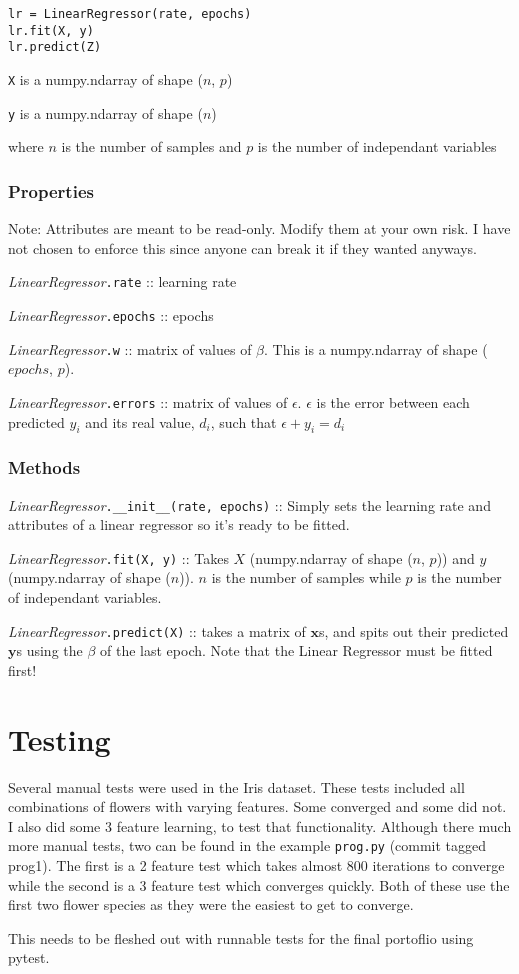 \documentclass{article}
\begin{document}
\begin{verbatim}
lr = LinearRegressor(rate, epochs)
lr.fit(X, y)
lr.predict(Z)
\end{verbatim}

\texttt{X} is a numpy.ndarray of shape ($n$, $p$)

\texttt{y} is a numpy.ndarray of shape ($n$)

where $n$ is the number of samples and $p$ is the number of independant variables

\subsubsection{Properties}

Note: Attributes are meant to be read-only. Modify them at your own risk. I have not chosen to enforce this since anyone can break it if they wanted anyways.

\textit{LinearRegressor}\texttt{.rate} :: learning rate

\textit{LinearRegressor}\texttt{.epochs} :: epochs

\textit{LinearRegressor}\texttt{.w} :: matrix of values of $\beta$. This is a numpy.ndarray of shape ($epochs$, $p$).

\textit{LinearRegressor}\texttt{.errors} :: matrix of values of $\epsilon$. $\epsilon$ is the error between each predicted $y_i$ and its real value, $d_i$, such that $\epsilon + y_i = d_i$

\subsubsection{Methods}

\textit{LinearRegressor}\texttt{.\_\_init\_\_(rate, epochs)} :: Simply sets the learning rate and attributes of a linear regressor so it's ready to be fitted.

\textit{LinearRegressor}\texttt{.fit(X, y)} :: Takes $X$ (numpy.ndarray of shape ($n$, $p$)) and $y$ (numpy.ndarray of shape ($n$)). $n$ is the number of samples while $p$ is the number of independant variables.

\textit{LinearRegressor}\texttt{.predict(X)} :: takes a matrix of $\mathbf{x}$s, and spits out their predicted $\textbf{y}$s using the $\beta$ of the last epoch. Note that the Linear Regressor must be fitted first!

\section{Testing}

Several manual tests were used in the Iris dataset. These tests included all
combinations of flowers with varying features. Some converged and some did not.
I also did some 3 feature learning, to test that functionality. Although there
much more manual tests, two can be found in the example \texttt{prog.py} (commit
tagged prog1). The first is a 2 feature test which takes almost 800 iterations
to converge while the second is a 3 feature test which converges quickly. Both
of these use the first two flower species as they were the easiest to get to
converge.

This needs to be fleshed out with runnable tests for the final portoflio using pytest.
\end{document}
